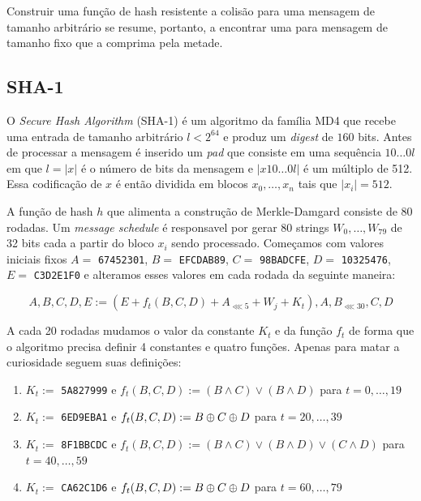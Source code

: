 Construir uma função de hash resistente a colisão para uma mensagem de tamanho arbitrário se resume, portanto, a encontrar uma para mensagem de tamanho fixo que a comprima pela metade.

\subsection{SHA-1}
\label{sec:sha-1}

O {\em Secure Hash Algorithm} (SHA-1) é um algoritmo da família MD4 que recebe uma entrada de tamanho arbitrário $l < 2^{64}$ e produz um {\em digest} de $160$ bits.
Antes de processar a mensagem é inserido um {\em pad} que consiste em uma sequência $10 \dots 0l$ em que $l = |x|$ é o número de bits da mensagem e $|x10 \dots 0l|$ é um múltiplo de 512.
Essa codificação de $x$ é então dividida em blocos $x_0, \dots, x_n$ tais que $|x_i| = 512$.

A função de hash $h$ que alimenta a construção de Merkle-Damgard consiste de 80 rodadas.
Um {\em message schedule} é responsavel por gerar 80 strings $W_0, \dots, W_{79}$ de 32 bits cada a partir do bloco $x_i$ sendo processado. 
Começamos com valores iniciais fixos $A =$ {\tt 67452301}, $B =$ {\tt EFCDAB89}, $C =$ {\tt 98BADCFE}, $D =$ {\tt 10325476}, $E =$ {\tt C3D2E1F0} e alteramos esses valores em cada rodada da seguinte maneira:

\begin{displaymath}
  A, B, C, D, E := (E + f_t(B,C,D) + A_{\lll 5} + W_j + K_t), A, B_{\lll 30}, C, D
\end{displaymath}

A cada 20 rodadas mudamos o valor da constante $K_t$ e da função $f_t$ de forma que o algoritmo precisa definir 4 constantes e quatro funções.
Apenas para matar a curiosidade seguem suas definições:
\begin{enumerate}
\item $K_t :=$ {\tt 5A827999} e $f_t(B,C,D) := (B \land C) \lor (B \land D)$ para $t = 0, \dots, 19$
\item $K_t :=$ {\tt 6ED9EBA1} e $f_t(B,C,D) := B \oplus C \oplus D$ para $t = 20, \dots, 39$ 
\item $K_t :=$ {\tt 8F1BBCDC} e $f_t(B,C,D) := (B \land C) \lor (B \land D) \lor (C \land D)$ para $t = 40, \dots, 59$
\item $K_t :=$ {\tt CA62C1D6} e $f_t(B,C,D) := B \oplus C \oplus D$ para $t = 60, \dots, 79$ 
\end{enumerate}


